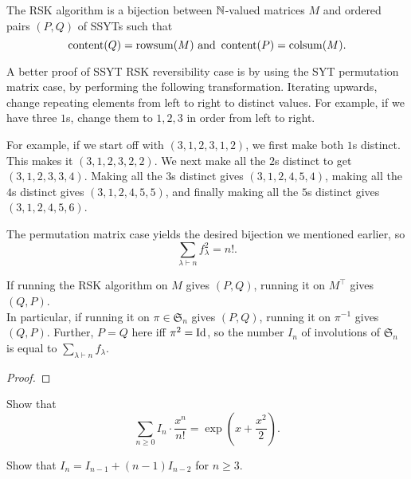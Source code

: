 	\begin{ftheo}
		The RSK algorithm is a bijection between $\mathbb{N}$-valued matrices $M$ and ordered pairs $(P,Q)$ of SSYTs such that
		\[ \operatorname{content}(Q) = \operatorname{rowsum}(M) \text{ and } \operatorname{content}(P) = \operatorname{colsum}(M). \] 
	\end{ftheo}

	A better proof of SSYT RSK reversibility case is by using the SYT permutation matrix case, by performing the following transformation. Iterating upwards, change repeating elements from left to right to distinct values. For example, if we have three $1$s, change them to $1,2,3$ in order from left to right.\\
	\begin{fex}
		For example, if we start off with $(3,1,2,3,1,2)$, we first make both $1$s distinct. This makes it $(3,1,2,3,2,2)$. We next make all the $2$s distinct to get $(3,1,2,3,3,4)$. Making all the $3$s distinct gives $(3,1,2,4,5,4)$, making all the $4$s distinct gives $(3,1,2,4,5,5)$, and finally making all the $5$s distinct gives $(3,1,2,4,5,6)$.
	\end{fex}


	The permutation matrix case yields the desired bijection we mentioned earlier, so
	\[ \sum_{\lambda \vdash n} f_\lambda^2 = n!. \]

	\begin{fprop}
		If running the RSK algorithm on $M$ gives $(P,Q)$, running it on $M^\top$ gives $(Q,P)$.\\
		In particular, if running it on $\pi \in \mathfrak{S}_n$ gives $(P,Q)$, running it on $\pi^{-1}$ gives $(Q,P)$. Further, $P = Q$ here iff $\pi^2 = \operatorname{Id}$, so the number $I_n$ of involutions of $\mathfrak{S}_n$ is equal to $\sum_{\lambda \vdash n} f_\lambda$.
	\end{fprop}
	\begin{proof}
		
	\end{proof}

	\begin{exercise}
		Show that
		\[ \sum_{n \ge 0} I_n \cdot \frac{x^n}{n!} = \exp\left( x + \frac{x^2}{2} \right). \]
	\end{exercise}
	\begin{exercise}
		Show that $I_n = I_{n-1} + (n-1) I_{n-2}$ for $n \ge 3$.
	\end{exercise}

